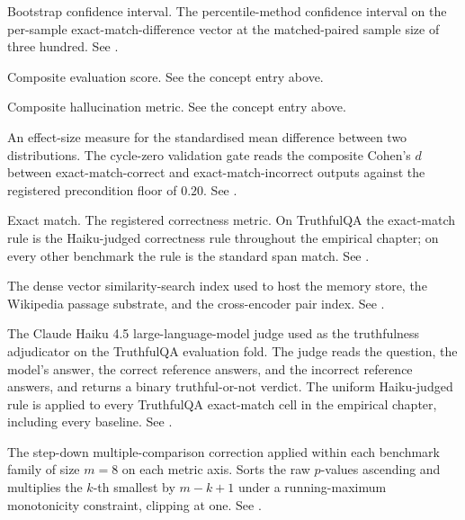 \begin{description}[style=nextline, leftmargin=0pt, labelindent=0pt, itemsep=6pt, parsep=0pt, font=\bfseries, beginpenalty=10000]

\item[Bootstrap CI.] Bootstrap confidence interval. The percentile-method confidence interval on the per-sample exact-match-difference vector at the matched-paired sample size of three hundred. See .

\item[CES.] Composite evaluation score. See the concept entry above.

\item[CHM.] Composite hallucination metric. See the concept entry above.

\item[Cohen's $d$.] An effect-size measure for the standardised mean difference between two distributions. The cycle-zero validation gate reads the composite Cohen's $d$ between exact-match-correct and exact-match-incorrect outputs against the registered precondition floor of $0.20$. See .

\item[EM.] Exact match. The registered correctness metric. On TruthfulQA the exact-match rule is the Haiku-judged correctness rule throughout the empirical chapter; on every other benchmark the rule is the standard span match. See .

\item[FAISS.] The dense vector similarity-search index used to host the memory store, the Wikipedia passage substrate, and the cross-encoder pair index. See .

\item[Haiku-judged.]\nopagebreak[4] The Claude Haiku 4.5 large-language-model judge used as the truthfulness adjudicator on the TruthfulQA evaluation fold. The judge reads the question, the model's answer, the correct reference answers, and the incorrect reference answers, and returns a binary truthful-or-not verdict. The uniform Haiku-judged rule is applied to every TruthfulQA exact-match cell in the empirical chapter, including every baseline. See .

\item[Holm-Bonferroni.] The step-down multiple-comparison correction applied within each benchmark family of size $m = 8$ on each metric axis. Sorts the raw $p$-values ascending and multiplies the $k$-th smallest by $m - k + 1$ under a running-maximum monotonicity constraint, clipping at one. See .


\end{description}
